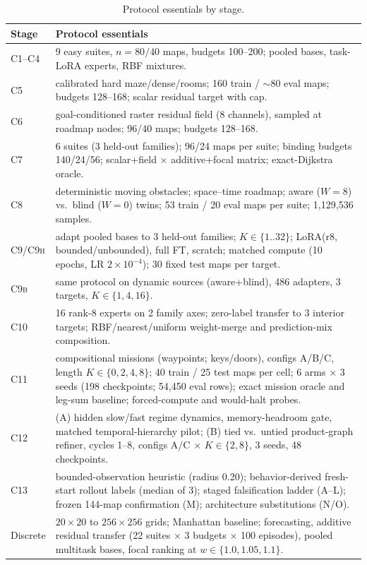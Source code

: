 \documentclass[11pt,letterpaper]{article}
\newcommand{\stage}[1]{\textsc{#1}}
\begin{document}
\begin{table}[h]
\centering
\small
\begin{tabular}{@{}lp{11.2cm}@{}}
\toprule
Stage & Protocol essentials \\
\midrule
\stage{C1--C4} & 9 easy suites, $n{=}80/40$ maps, budgets 100--200; pooled bases, task-LoRA experts, RBF mixtures. \\
\stage{C5} & calibrated hard maze/dense/rooms; 160 train / ${\sim}80$ eval maps; budgets 128--168; scalar residual target with cap. \\
\stage{C6} & goal-conditioned raster residual field (8 channels), sampled at roadmap nodes; 96/40 maps; budgets 128--168. \\
\stage{C7} & 6 suites (3 held-out families); 96/24 maps per suite; binding budgets 140/24/56; scalar+field $\times$ additive+focal matrix; exact-Dijkstra oracle. \\
\stage{C8} & deterministic moving obstacles; space--time roadmap; aware ($W{=}8$) vs.\ blind ($W{=}0$) twins; 53 train / 20 eval maps per suite; 1{,}129{,}536 samples. \\
\stage{C9/C9h} & adapt pooled bases to 3 held-out families; $K\in\{1..32\}$; LoRA(r8, bounded/unbounded), full FT, scratch; matched compute (10 epochs, LR $2{\times}10^{-4}$); 30 fixed test maps per target. \\
\stage{C9b} & same protocol on dynamic sources (aware+blind), 486 adapters, 3 targets, $K\in\{1,4,16\}$. \\
\stage{C10} & 16 rank-8 experts on 2 family axes; zero-label transfer to 3 interior targets; RBF/nearest/uniform weight-merge and prediction-mix composition. \\
\stage{C11} & compositional missions (waypoints; keys/doors), configs A/B/C, length $K\in\{0,2,4,8\}$; 40 train / 25 test maps per cell; 6 arms $\times$ 3 seeds (198 checkpoints; 54{,}450 eval rows); exact mission oracle and leg-sum baseline; forced-compute and would-halt probes. \\
\stage{C12} & (A) hidden slow/fast regime dynamics, memory-headroom gate, matched temporal-hierarchy pilot; (B) tied vs.\ untied product-graph refiner, cycles 1--8, configs A/C $\times$ $K\in\{2,8\}$, 3 seeds, 48 checkpoints. \\
\stage{C13} & bounded-observation heuristic (radius 0.20); behavior-derived fresh-start rollout labels (median of 3); staged falsification ladder (\stage{A}--\stage{L}); frozen 144-map confirmation (\stage{M}); architecture substitutions (\stage{N}/\stage{O}). \\
Discrete & $20{\times}20$ to $256{\times}256$ grids; Manhattan baseline; forecasting, additive residual transfer (22 suites $\times$ 3 budgets $\times$ 100 episodes), pooled multitask bases, focal ranking at $w\in\{1.0,1.05,1.1\}$. \\
\bottomrule
\end{tabular}
\caption{Protocol essentials by stage.}
\label{tab:protocols}
\end{table}
\end{document}
